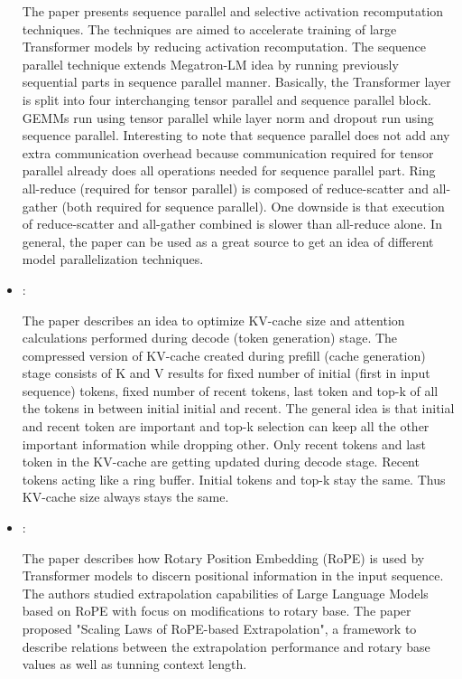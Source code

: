 \begin{itemize}
    The paper presents sequence parallel and selective activation recomputation techniques. The techniques are aimed to accelerate training of large Transformer models by reducing activation recomputation. The sequence parallel technique extends Megatron-LM idea by running previously sequential parts in sequence parallel manner. Basically, the Transformer layer is split into four interchanging tensor parallel and sequence parallel block. GEMMs run using tensor parallel while layer norm and dropout run using sequence parallel. Interesting to note that sequence parallel does not add any extra communication overhead because communication required for tensor parallel already does all operations needed for sequence parallel part. Ring all-reduce (required for tensor parallel) is composed of reduce-scatter and all-gather (both required for sequence parallel). One downside is that execution of reduce-scatter and all-gather combined is slower than all-reduce alone. In general, the paper can be used as a great source to get an idea of different model parallelization techniques.

    \item \cite{Wang:KvCacheDrop:2025}:

    The paper describes an idea to optimize KV-cache size and attention calculations performed during decode (token generation) stage. The compressed version of KV-cache created during prefill (cache generation) stage consists of K and V results for fixed number of initial (first in input sequence) tokens, fixed number of recent tokens, last token and top-k of all the tokens in between initial initial and recent. The general idea is that initial and recent token are important and top-k selection can keep all the other important information while dropping other. Only recent tokens and last token in the KV-cache are getting updated during decode stage. Recent tokens acting like a ring buffer. Initial tokens and top-k stay the same. Thus KV-cache size always stays the same.

    \item \cite{Liu:ScalingLawsRoPE:2024}:

    The paper describes how Rotary Position Embedding (RoPE) is used by Transformer models to discern positional information in the input sequence. The authors studied extrapolation capabilities of Large Language Models based on RoPE with focus on modifications to rotary base. The paper proposed "Scaling Laws of RoPE-based Extrapolation", a framework to describe relations between the extrapolation performance and rotary base values as well as tunning context length.


\end{itemize}
